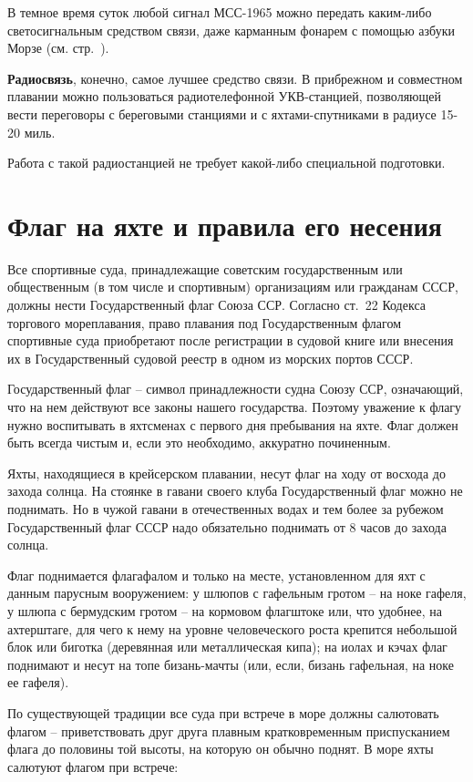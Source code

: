 \documentclass[a4paper, 12pt, twoside, final]{scrbook}
\begin{document}
        В темное время суток любой сигнал МСС-1965 можно передать каким-либо светосигнальным средством связи, даже карманным фонарем с помощью азбуки Морзе (см. стр.~\pageref{app:6}).

        \textbf{Радиосвязь}, конечно, самое лучшее средство связи. В прибрежном и совместном плавании можно пользоваться радиотелефонной УКВ-станцией, позволяющей вести переговоры с береговыми станциями и с яхтами-спутниками в радиусе 15-20 миль.

        Работа с такой радиостанцией не требует какой-либо специальной подготовки.

\section{Флаг на яхте и правила его несения}

Все спортивные суда, принадлежащие советским государственным или общественным (в том числе и спортивным) организациям или гражданам СССР, должны нести Государственный флаг Союза ССР. Согласно ст.~22 Кодекса торгового мореплавания, право плавания под Государственным флагом спортивные суда приобретают после регистрации в судовой книге или внесения их в Государственный судовой реестр в одном из морских портов СССР.

Государственный флаг \--- символ принадлежности судна Союзу ССР, означающий, что на нем действуют все законы нашего государства. Поэтому уважение к флагу нужно воспитывать в яхтсменах с первого дня пребывания на яхте. Флаг должен быть всегда чистым и, если это необходимо, аккуратно починенным.

Яхты, находящиеся в крейсерском плавании, несут флаг на ходу от восхода до захода солнца. На стоянке в гавани своего клуба Государственный флаг можно не поднимать. Но в чужой гавани в отечественных водах и тем более за рубежом Государственный флаг СССР надо обязательно поднимать от 8 часов до захода солнца.

Флаг поднимается флагафалом и только на месте, установленном для яхт с данным парусным вооружением: у шлюпов с гафельным гротом \--- на ноке гафеля, у шлюпа с бермудским гротом \--- на кормовом флагштоке или, что удобнее, на ахтерштаге, для чего к нему на уровне человеческого роста крепится небольшой блок или биготка (деревянная или металлическая кипа); на иолах и кэчах флаг поднимают и несут на топе бизань-мачты (или, если, бизань гафельная, на ноке ее гафеля).

По существующей традиции все суда при встрече в море должны салютовать флагом \--- приветствовать друг друга плавным кратковременным приспусканием флага до половины той высоты, на которую он обычно поднят. В море яхты салютуют флагом при встрече:
\end{document}
